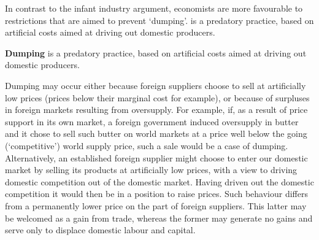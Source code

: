In contrast to the infant industry argument, economists are more favourable to restrictions that are aimed to prevent `dumping'.  is a predatory practice, based on artificial costs aimed at driving out domestic producers.

\begin{DefBox}
\textbf{Dumping} is a predatory practice, based on artificial costs aimed at driving out domestic producers.
\end{DefBox}

Dumping may occur either because foreign suppliers choose to sell at artificially low prices (prices below their marginal cost for example), or because of surpluses in foreign markets resulting from oversupply. For example, if, as a result of price support in its own market, a foreign government induced oversupply in butter and it chose to sell such butter on world markets at a price well below the going (`competitive') world supply price, such a sale would be a case of dumping. Alternatively, an established foreign supplier might choose to enter our domestic market by selling its products at artificially low prices, with a view to driving domestic competition out of the domestic market. Having driven out the domestic competition it would then be in a position to raise prices. Such behaviour differs from a permanently lower price on the part of foreign suppliers. This latter may be welcomed as a gain from trade, whereas the former may generate no gains and serve only to displace domestic labour and capital.